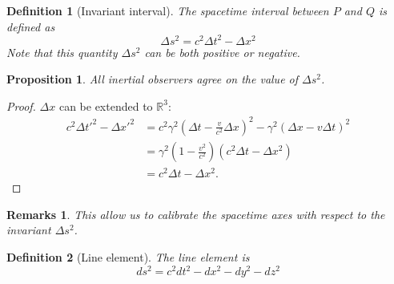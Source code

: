 \documentclass[a4paper]{article}
\newtheorem{remarks}{Remarks}[section]
\theoremstyle{new}
\newtheorem{defi}{Definition}[section]
\newtheorem{prop}{Proposition}[section]
\begin{document}
\begin{defi}[Invariant interval]
  The spacetime interval between $P$ and $Q$ is defined as
$$\Delta s^2 = c^2 \Delta t^2 - \Delta x^2$$
  Note that this quantity $\Delta s^2$ can be both positive or negative.
\end{defi}
\begin{prop}
  All inertial observers agree on the value of $\Delta s^2$.
\end{prop}
\begin{proof}
$\Delta x$ can be extended to $\mathbb{R}^3$:
\begin{align*}
    c^2 \Delta t'^2 - \Delta x'^2 &= c^2 \gamma^2 \left(\Delta t - \frac{v}{c^2}\Delta x\right)^2 - \gamma^2 (\Delta x - v\Delta t)^2\\
    &= \gamma^2 \left(1 - \frac{v^2}{c^2}\right)(c^2 \Delta t - \Delta x^2)\\
    &= c^2\Delta t - \Delta x^2. 
  \end{align*}
\end{proof}
\begin{remarks}
This allow us to calibrate the spacetime axes with respect to the invariant $\Delta s^2$.
\end{remarks}
\begin{defi}[Line element]
  The line element is
$$d s^2 = c^2 d t^2 - d x^2 - d y^2 - d z^2$$
\end{defi}
\end{document}
